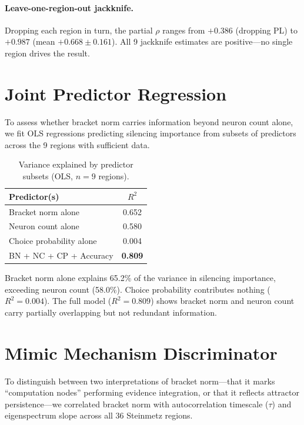 \documentclass{article}
\begin{document}
\paragraph{Leave-one-region-out jackknife.} Dropping each region in turn, the partial $\rho$ ranges from $+0.386$ (dropping PL) to $+0.987$ (mean $+0.668 \pm 0.161$). All 9 jackknife estimates are positive---no single region drives the result.

\section{Joint Predictor Regression}
\label{app:joint}

To assess whether bracket norm carries information beyond neuron count alone, we fit OLS regressions predicting silencing importance from subsets of predictors across the 9 regions with sufficient data.

\begin{table}[h]
\centering
\caption{Variance explained by predictor subsets (OLS, $n = 9$ regions).}
\label{tab:joint}
\begin{tabular}{lc}
\toprule
Predictor(s) & $R^2$ \\
\midrule
Bracket norm alone & 0.652 \\
Neuron count alone & 0.580 \\
Choice probability alone & 0.004 \\
BN + NC + CP + Accuracy & \textbf{0.809} \\
\bottomrule
\end{tabular}
\end{table}

Bracket norm alone explains 65.2\% of the variance in silencing importance, exceeding neuron count (58.0\%). Choice probability contributes nothing ($R^2 = 0.004$). The full model ($R^2 = 0.809$) shows bracket norm and neuron count carry partially overlapping but not redundant information.

\section{Mimic Mechanism Discriminator}
\label{app:mimic}

To distinguish between two interpretations of bracket norm---that it marks ``computation nodes'' performing evidence integration, or that it reflects attractor persistence---we correlated bracket norm with autocorrelation timescale ($\tau$) and eigenspectrum slope across all 36 Steinmetz regions.
\end{document}

